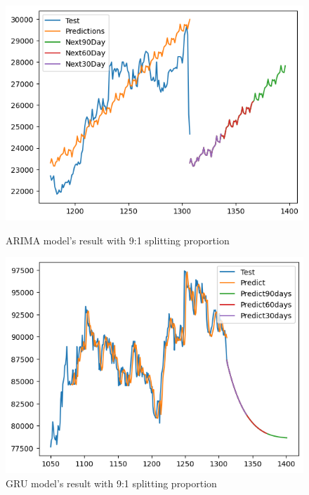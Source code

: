 \documentclass{ieeeojies}
\begin{document}
\begin{figure}[H]
    \centering
    \begin{minipage}{0.45\linewidth}
        \centering
        \includegraphics[width=\linewidth]{bibliography/diagram/ARIMA-VCB.png}
        \caption{ARIMA model’s result with 9:1 splitting proportion}
        \label{fig:ARIMA-VCB}
    \end{minipage}
    \hfill
    \begin{minipage}{0.45\linewidth}
        \centering
        \includegraphics[width=\linewidth]{bibliography/diagram/GRU-VCB.png}
        \caption{GRU model’s result with 9:1 splitting proportion}
        \label{fig:GRU-VCB}
    \end{minipage}
\end{figure}
\end{document}

